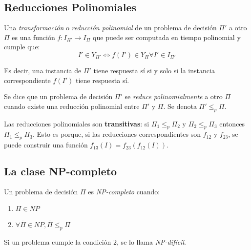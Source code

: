 \documentclass[a4paper]{report}
\begin{document}
\subsection{Reducciones Polinomiales}
\label{reducciones}

Una \textit{transformación} o \textit{reducción polinomial} de un problema de decisión $\Pi'$ a otro $\Pi$ es una función $f: I_{\Pi'} \longrightarrow I_{\Pi}$ que puede ser computada en tiempo polinomial y cumple que:
$$I' \in Y_{\Pi'} \iff f(I') \in Y_{\Pi} \forall I' \in I_{\Pi'}$$

Es decir, una instancia de $\Pi'$ tiene respuesta sí si y solo si la instancia correspondiente $f(I')$ tiene respuesta sí.

Se dice que un problema de decisión $\Pi'$ se \textit{reduce polinomialmente} a otro $\Pi$ cuando existe una reducción polinomial entre $\Pi'$ y $\Pi$. Se denota $\Pi' \leq_p \Pi$.

Las reducciones polinomiales son \textbf{transitivas}: si $\Pi_1 \leq_p \Pi_2$ y $\Pi_2 \leq_p \Pi_3$ entonces $\Pi_1 \leq_p \Pi_3$. Esto es porque, si las reducciones correspondientes son $f_{12}$ y $f_{23}$, se puede construir una función $f_{13}(I) = f_{23}(f_{12}(I))$.

\subsection{La clase NP-completo}
\label{np-completo}
\label{np-hard}

Un problema de decisión $\Pi$ es \textit{NP-completo} cuando:
\begin{enumerate}
    \item $\Pi \in NP$
    \item $\forall \bar{\Pi} \in NP, \bar{\Pi} \leq_p \Pi$
\end{enumerate}

Si un problema cumple la condición $2$, se lo llama \textit{NP-difícil}.
\end{document}
